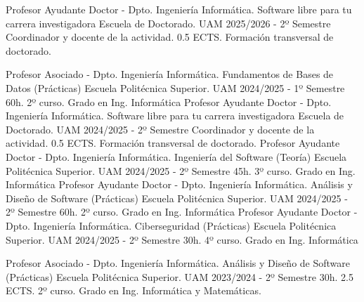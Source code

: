 

\begin{cventries}

  \cventry
	{Profesor Ayudante Doctor - Dpto. Ingeniería Informática.} %
	{Software libre para tu carrera investigadora} %
	{Escuela de Doctorado. UAM} %
	{2025/2026 - 2º Semestre} %
	{Coordinador y docente de la actividad. 0.5 ECTS. Formación transversal de doctorado.}

  \cventry
	{Profesor Asociado - Dpto. Ingeniería Informática.} %
	{Fundamentos de Bases de Datos (Prácticas)} %
	{Escuela Politécnica Superior. UAM} %
	{2024/2025 - 1º Semestre} %
	{60h. 2º curso. Grado en Ing. Informática}
  \cventry
	{Profesor Ayudante Doctor - Dpto. Ingeniería Informática.} %
	{Software libre para tu carrera investigadora} %
	{Escuela de Doctorado. UAM} %
	{2024/2025 - 2º Semestre} %
	{Coordinador y docente de la actividad. 0.5 ECTS. Formación transversal de doctorado.}
  \cventry
	{Profesor Ayudante Doctor - Dpto. Ingeniería Informática.} %
	{Ingeniería del Software (Teoría)} %
	{Escuela Politécnica Superior. UAM} %
	{2024/2025 - 2º Semestre} %
	{45h. 3º curso. Grado en Ing. Informática}
  \cventry
	{Profesor Ayudante Doctor - Dpto. Ingeniería Informática.} %
	{Análisis y Diseño de Software (Prácticas)} %
	{Escuela Politécnica Superior. UAM} %
	{2024/2025 - 2º Semestre} %
	{60h. 2º curso. Grado en Ing. Informática}
  \cventry
	{Profesor Ayudante Doctor - Dpto. Ingeniería Informática.} %
	{Ciberseguridad (Prácticas)} %
	{Escuela Politécnica Superior. UAM} %
	{2024/2025 - 2º Semestre} %
	{30h. 4º curso. Grado en Ing. Informática}

  \cventry
    {Profesor Asociado - Dpto. Ingeniería Informática.} %
    {Análisis y Diseño de Software (Prácticas)} %
    {Escuela Politécnica Superior. UAM} %
    {2023/2024 - 2º Semestre} %
    {30h. 2.5 ECTS. 2º curso. Grado en Ing. Informática y Matemáticas.}
    

\end{cventries}
